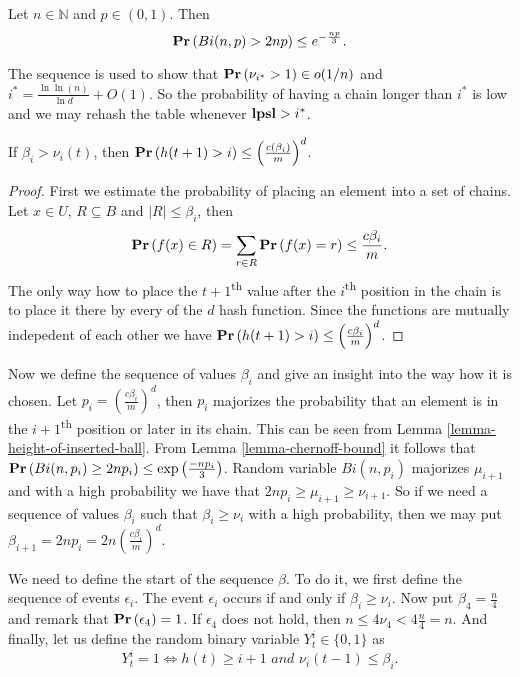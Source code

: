 \begin{lemma}
\label{lemma-chernoff-bound}
Let $n \in \mathbb{N}$ and $p \in (0, 1)$. Then $$\mathbf{Pr}\left(Bi(n, p) > 2np\right) \leq e ^ {- \frac{np}{3}} \textit{.}$$
\end{lemma}

The sequence is used to show that $\mathbf{Pr}\left(\nu_{i^{*}} > 1\right) \in o(1/n)$ and $i^* = \frac{\ln \ln (n)}{\ln d} + O(1)$. So the probability of having a chain longer than $i^*$ is low and we may rehash the table whenever $\mathbf{lpsl} > i^*$.

\begin{lemma}
\label{lemma-height-of-inserted-ball}
If $\beta_i > \nu_i(t)$, then $\mathbf{Pr}\left(h(t + 1) > i\right) \leq \left(\frac{c(\beta_i)}{m}\right) ^ d$.
\end{lemma}
\begin{proof}
First we estimate the probability of placing an element into a set of chains. Let $x \in U$, $R \subseteq B$ and $|R| \leq \beta_i$, then $$\mathbf{Pr}\left(f(x) \in R\right) = \displaystyle\sum_{r \in R} \mathbf{Pr}\left(f(x) = r\right) \leq \frac{c\beta_i}{m} \textit{.}$$
The only way how to place the $t + 1$\textsuperscript{th} value after the $i$\textsuperscript{th} position in the chain is to place it there by every of the $d$ hash function. Since the functions are mutually indepedent of each other we have $\mathbf{Pr}\left(h(t + 1) > i\right) \leq \left(\frac{c \beta_i}{m}\right) ^ d$.
\end{proof}

Now we define the sequence of values $\beta_i$ and give an insight into the way how it is chosen. Let $p_i = \left(\frac{c\beta_i}{m}\right) ^ d$, then $p_i$ majorizes the probability that an element is in the $i + 1$\textsuperscript{th} position or later in its chain. This can be seen from Lemma \ref{lemma-height-of-inserted-ball}. From Lemma \ref{lemma-chernoff-bound} it follows that $\mathbf{Pr}\left(Bi(n, p_i) \geq 2np_i\right) \leq \exp\left(\frac{-np_i}{3}\right)$. Random variable $Bi(n, p_i)$ majorizes $\mu_{i + 1}$ and with a high probability we have that $2np_i \geq \mu_{i + 1} \geq \nu_{i + 1}$. So if we need a sequence of values $\beta_i$ such that $\beta_i \geq \nu_{i}$ with a high probability, then we may put $\beta_{i + 1} = 2np_i = 2n\left(\frac{c\beta_i}{m}\right) ^ d$.

We need to define the start of the sequence $\beta$. To do it, we first define the sequence of events $\epsilon_i$. The event $\epsilon_i$ occurs if and only if $\beta_i \geq \nu_i$. Now put $\beta_4 = \frac{n}{4}$ and remark that $\mathbf{Pr}\left(\epsilon_4\right) = 1$. If $\epsilon_4$ does not hold, then $n \leq 4 \nu_4 < 4 \frac{n}{4} = n$. And finally, let us define the random binary variable $Y_t^i \in \{0, 1\}$ as $$Y_t^i = 1 \Leftrightarrow h(t) \geq i + 1 \textit{ and } \nu_i(t - 1) \leq \beta_i \textit{.}$$

